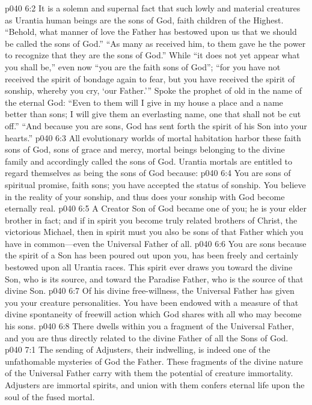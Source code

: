 \vs p040 6:2 It is a solemn and supernal fact that such lowly and material creatures as Urantia human beings are the sons of God, faith children of the Highest. “Behold, what manner of love the Father has bestowed upon us that we should be called the sons of God.” “As many as received him, to them gave he the power to recognize that they are the sons of God.” While “it does not yet appear what you shall be,” even now “you are the faith sons of God”; “for you have not received the spirit of bondage again to fear, but you have received the spirit of sonship, whereby you cry, ‘our Father.’” Spoke the prophet of old in the name of the eternal God: “Even to them will I give in my house a place and a name better than sons; I will give them an everlasting name, one that shall not be cut off.” “And because you are sons, God has sent forth the spirit of his Son into your hearts.”
\vs p040 6:3 All evolutionary worlds of mortal habitation harbor these faith sons of God, sons of grace and mercy, mortal beings belonging to the divine family and accordingly called the sons of God. Urantia mortals are entitled to regard themselves as being the sons of God because:
\pc \vs p040 6:4 \bibnobreakspace You are sons of spiritual promise, faith sons; you have accepted the status of sonship. You believe in the reality of your sonship, and thus does your sonship with God become eternally real.
\pc \vs p040 6:5 \bibnobreakspace A Creator Son of God became one of you; he is your elder brother in fact; and if in spirit you become truly related brothers of Christ, the victorious Michael, then in spirit must you also be sons of that Father which you have in common---even the Universal Father of all.
\pc \vs p040 6:6 \bibnobreakspace You are sons because the spirit of a Son has been poured out upon you, has been freely and certainly bestowed upon all Urantia races. This spirit ever draws you toward the divine Son, who is its source, and toward the Paradise Father, who is the source of that divine Son.
\pc \vs p040 6:7 \bibnobreakspace Of his divine free\hyp{}willness, the Universal Father has given you your creature personalities. You have been endowed with a measure of that divine spontaneity of freewill action which God shares with all who may become his sons.
\pc \vs p040 6:8 \bibnobreakspace There dwells within you a fragment of the Universal Father, and you are thus directly related to the divine Father of all the Sons of God.
\vs p040 7:1 The sending of Adjusters, their indwelling, is indeed one of the unfathomable mysteries of God the Father. These fragments of the divine nature of the Universal Father carry with them the potential of creature immortality. Adjusters are immortal spirits, and union with them confers eternal life upon the soul of the fused mortal.
